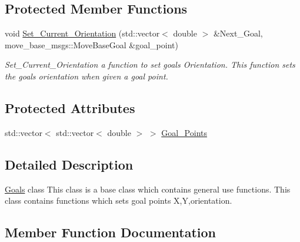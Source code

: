\subsection*{Protected Member Functions}
\begin{DoxyCompactItemize}
\item 
void \hyperlink{classGoals_a1aded121d6fdcad38f627b46961b58d0}{Set\+\_\+\+Current\+\_\+\+Orientation} (std\+::vector$<$ double $>$ \&Next\+\_\+\+Goal, move\+\_\+base\+\_\+msgs\+::\+Move\+Base\+Goal \&goal\+\_\+point)
\begin{DoxyCompactList}\small\item\em Set\+\_\+\+Current\+\_\+\+Orientation a function to set goal\textquotesingle{}s Orientation. This function sets the goal\textquotesingle{}s orientation when given a goal point. \end{DoxyCompactList}\end{DoxyCompactItemize}
\subsection*{Protected Attributes}
\begin{DoxyCompactItemize}
\item 
std\+::vector$<$ std\+::vector$<$ double $>$ $>$ \hyperlink{classGoals_ad6033ccf299d860e3d5bb826ea5a8bb6}{Goal\+\_\+\+Points}
\end{DoxyCompactItemize}


\subsection{Detailed Description}
\hyperlink{classGoals}{Goals} class This class is a base class which contains general use functions. This class contains functions which sets goal point\textquotesingle{}s X,Y,orientation. 

\subsection{Member Function Documentation}
